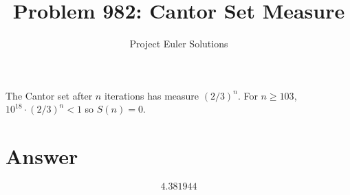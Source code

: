 \documentclass[11pt]{article}
\title{Problem 982: Cantor Set Measure}
\author{Project Euler Solutions}
\date{}
\begin{document}
\maketitle
The Cantor set after $n$ iterations has measure $(2/3)^n$. For $n \ge 103$, $10^{18}\cdot(2/3)^n < 1$ so $S(n)=0$.
\section{Answer}

\[
\boxed{4.381944}
\]
\end{document}
